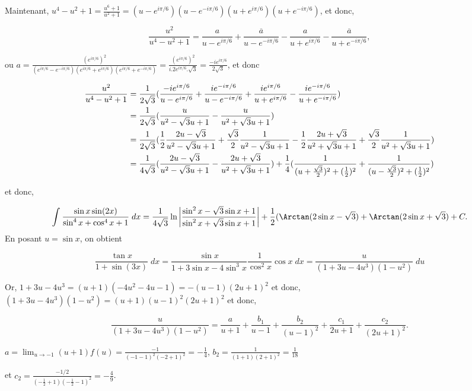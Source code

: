 {{Maintenant, $u^4-u^2+1=\frac{u^6+1}{u^2+1}=(u-e^{i\pi/6})(u-e^{-i\pi/6})(u+e^{i\pi/6})(u+e^{-i\pi/6})$, et donc,

$$\frac{u^2}{u^4-u^2+1}=\frac{a}{u-e^{i\pi/6}}+\frac{\overline{a}}{u-e^{-i\pi/6}}-\frac{a}{u+e^{i\pi/6}}-\frac{\overline{a}}{u+e^{-i\pi/6}},$$

ou $a=\frac{(e^{i\pi/6})^2}{(e^{i\pi/6}-e^{-i\pi/6})(e^{i\pi/6}+e^{i\pi/6})(e^{i\pi/6}+e^{-i\pi/6})}=
\frac{(e^{i\pi/6})^2}{i.2e^{i\pi/6}.\sqrt{3}}=\frac{-ie^{i\pi/6}}{2\sqrt{3}}$, et donc

\begin{align*}\ensuremath
\frac{u^2}{u^4-u^2+1}&=\frac{1}{2\sqrt{3}}(\frac{-ie^{i\pi/6}}{u-e^{i\pi/6}}+\frac{ie^{-i\pi/6}}{u-e^{-i\pi/6}}+\frac{ie^{i\pi/6}}{u+e^{i\pi/6}}-\frac{ie^{-i\pi/6}}{u+e^{-i\pi/6}})\\
 &=\frac{1}{2\sqrt{3}}(\frac{u}{u^2-\sqrt{3}u+1}-\frac{u}{u^2+\sqrt{3}u+1})\\
 &=\frac{1}{2\sqrt{3}}(\frac{1}{2}\frac{2u-\sqrt{3}}{u^2-\sqrt{3}u+1}+\frac{\sqrt{3}}{2}\frac{1}
 {u^2-\sqrt{3}u+1}-\frac{1}{2}\frac{2u+\sqrt{3}}{u^2+\sqrt{3}u+1}+\frac{\sqrt{3}}{2}\frac{1}{u^2+\sqrt{3}u+1})\\
 &=\frac{1}{4\sqrt{3}}(\frac{2u-\sqrt{3}}{u^2-\sqrt{3}u+1}-\frac{2u+\sqrt{3}}{u^2+\sqrt{3}u+1})
 +\frac{1}{4}(\frac{1}{(u+\frac{\sqrt{3}}{2})^2+(\frac{1}{2})^2}+
 \frac{1}{(u-\frac{\sqrt{3}}{2})^2+(\frac{1}{2})^2})
\end{align*}

et donc,

$$\int_{}^{}\frac{\sin x\sin(2x)}{\sin^4x+\cos^4x+1}\;dx=\frac{1}{4\sqrt{3}}\ln\left|
\frac{\sin^2x-\sqrt{3}\sin x+1}{\sin^2x+\sqrt{3}\sin x+1}\right|+\frac{1}{2}(\Arctan(2\sin x-\sqrt{3})+\Arctan(2\sin x+\sqrt{3})+C.$$
En posant $u=\sin x$, on obtient 

$$\frac{\tan x}{1+\sin(3x)}\;dx=\frac{\sin x}{1+3\sin x-4\sin^3x}\frac{1}{\cos^2x}\cos x\;dx=\frac{u}{(1+3u-4u^3)(1-u^2)}\;du$$

Or, $1+3u-4u^3=(u+1)(-4u^2-4u-1)=-(u-1)(2u+1)^2$ et donc, $(1+3u-4u^3)(1-u^2)=(u+1)(u-1)^2(2u+1)^2$ et donc,

$$\frac{u}{(1+3u-4u^3)(1-u^2)}=\frac{a}{u+1}+\frac{b_1}{u-1}+\frac{b_2}{(u-1)^2}+\frac{c_1}{2u+1}+\frac{c_2}{(2u+1)^2}.$$

$a=\lim_{u\rightarrow -1}(u+1)f(u)=\frac{-1}{(-1-1)^2(-2+1)^2}=-\frac{1}{4}$, $b_2=\frac{1}{(1+1)(2+1)^2}=\frac{1}{18}$

et $c_2=\frac{-1/2}{(-\frac{1}{2}+1)(-\frac{1}{2}-1)^2}=-\frac{4}{9}$.

}}
